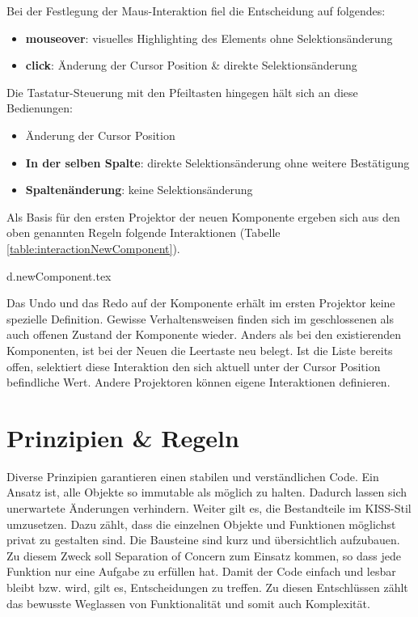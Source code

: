\noindent
Bei der Festlegung der Maus-Interaktion fiel die Entscheidung auf folgendes:

\begin{itemize}
    \item \textbf{mouseover}: visuelles Highlighting des Elements ohne Selektionsänderung
    \item \textbf{click}: Änderung der Cursor Position \& direkte Selektionsänderung
\end{itemize}

\noindent
Die Tastatur-Steuerung mit den Pfeiltasten hingegen hält sich an diese Bedienungen:

\begin{itemize}
    \item Änderung der Cursor Position
    \item \textbf{In der selben Spalte}: direkte Selektionsänderung ohne weitere Bestätigung
    \item \textbf{Spaltenänderung}: keine Selektionsänderung
\end{itemize}

\noindent
Als Basis für den ersten Projektor der neuen Komponente ergeben sich aus den oben genannten Regeln folgende Interaktionen (Tabelle \ref{table:interactionNewComponent}).

\clearpage
{d.newComponent.tex}

Das Undo und das Redo auf der Komponente erhält im ersten Projektor keine spezielle Definition.
Gewisse Verhaltensweisen finden sich im geschlossenen als auch offenen Zustand der Komponente wieder.
Anders als bei den existierenden Komponenten, ist bei der Neuen die Leertaste neu belegt. 
Ist die Liste bereits offen, selektiert diese Interaktion den sich aktuell unter der Cursor Position befindliche Wert.
Andere Projektoren können eigene Interaktionen definieren.


\section{Prinzipien \& Regeln}
\label{sec:principleRules}

Diverse Prinzipien garantieren einen stabilen und verständlichen Code.
Ein Ansatz ist, alle Objekte so immutable als möglich zu halten.
Dadurch lassen sich unerwartete Änderungen verhindern.
Weiter gilt es, die Bestandteile im KISS-Stil umzusetzen.
Dazu zählt, dass die einzelnen Objekte und Funktionen möglichst privat zu gestalten sind.
Die Bausteine sind kurz und übersichtlich aufzubauen.
Zu diesem Zweck soll Separation of Concern zum Einsatz kommen, so dass jede Funktion nur eine Aufgabe zu erfüllen hat.
Damit der Code einfach und lesbar bleibt bzw. wird, gilt es, Entscheidungen zu treffen.
Zu diesen Entschlüssen zählt das bewusste Weglassen von Funktionalität und somit auch Komplexität.

